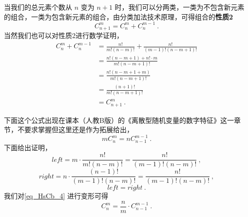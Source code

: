 当我们的总元素个数从 $n$ 变为 $n+1$ 时，我们可以分两类，一类为不包含新元素的组合，一类为包含新元素的组合，由分类加法技术原理，可得组合的\textbf{性质2}
\begin{equation}\label{eq_HsCb_5}
C_{n + 1}^m = C_n^m + C_n^{m -1}~.
\end{equation}
当然我们也可以对性质2进行数学证明，
\begin{equation}
\begin{aligned}
C_n^m + C_n^{m - 1} 
&= \frac{n!}{m!(n-m)!} + \frac{n!}{(m - 1)!(n - m + 1)!}\\
&= \frac{n!(n - m + 1) + n!\cdot m}{m!(n - m + 1)!}\\
&= \frac{n!(n - m + 1 + m) }{m!(n - m + 1)!}\\
&= \frac{(n + 1)!}{m!(n - m + 1)!}\\
&= C_{n + 1}^m~.
\end{aligned}
\end{equation}

下面这个公式出现在课本（人教B版）的《离散型随机变量的数字特征》这一章节，不要求掌握但这里还是作为拓展给出，
\begin{equation}\label{eq_HsCb_4}
mC_n^m = nC_{n-1}^{m-1}~.
\end{equation}
下面给出证明，
\begin{equation}
left = m\cdot \frac{n!}{m!(n-m)!} = \frac{n!}{(m-1)!(n-m)!}~,
\end{equation}
\begin{equation}
right = n\cdot \frac{(n-1)!}{(m-1)!(n-m)!} = \frac{n!}{(m-1)!(n-m)!}~,
\end{equation}
\begin{equation}
left = right~.
\end{equation}
我们对\autoref{eq_HsCb_4} 进行变形可得
\begin{equation}
C_n^m = \frac{n}{m} \cdot C_{n-1}^{m-1}~.
\end{equation}